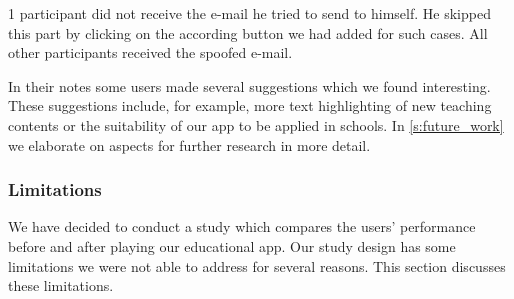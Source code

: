 \begin{description}[leftmargin=0cm]
1 participant did not receive the e-mail he tried to send to himself.
He skipped this part by clicking on the according button we had added for such cases.
All other participants received the spoofed e-mail.
	\item[Further Suggestions:] In their notes some users made several suggestions which we found interesting.
These suggestions include, for example, more text highlighting of new teaching contents or the suitability of our app to be applied in schools.
In \autoref{s:future_work} we elaborate on aspects for further research in more detail.
\end{description}

\subsubsection{Limitations}
We have decided to conduct a study which compares the users' performance before and after playing our educational app.
Our study design has some limitations we were not able to address for several reasons.
This section discusses these limitations.

